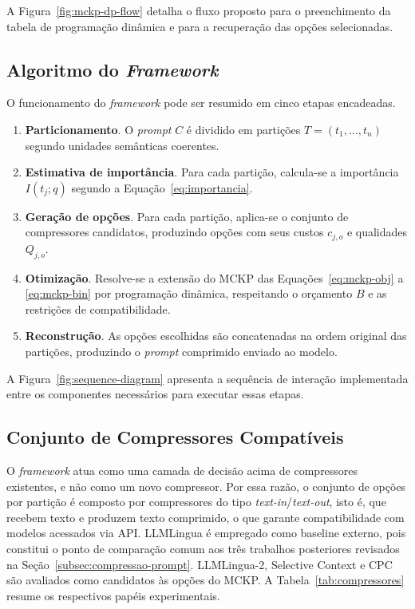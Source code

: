 A Figura~\ref{fig:mckp-dp-flow} detalha o fluxo proposto para o preenchimento da tabela de programação dinâmica e para a recuperação das opções selecionadas.



\subsection{Algoritmo do \textit{Framework}}
\label{subsec:algoritmo}

O funcionamento do \textit{framework} pode ser resumido em cinco etapas encadeadas.

\begin{enumerate}[leftmargin=1.8em]
\item \textbf{Particionamento}. O \textit{prompt} $C$ é dividido em partições $T = (t_1, \ldots, t_n)$ segundo unidades semânticas coerentes.

\item \textbf{Estimativa de importância}. Para cada partição, calcula-se a importância $I(t_j; q)$ segundo a Equação~\ref{eq:importancia}.

\item \textbf{Geração de opções}. Para cada partição, aplica-se o conjunto de compressores candidatos, produzindo opções com seus custos $c_{j,o}$ e qualidades $Q_{j,o}$.

\item \textbf{Otimização}. Resolve-se a extensão do MCKP das Equações~\ref{eq:mckp-obj} a \ref{eq:mckp-bin} por programação dinâmica, respeitando o orçamento $B$ e as restrições de compatibilidade.

\item \textbf{Reconstrução}. As opções escolhidas são concatenadas na ordem original das partições, produzindo o \textit{prompt} comprimido enviado ao modelo.
\end{enumerate}

A Figura~\ref{fig:sequence-diagram} apresenta a sequência de interação implementada entre os componentes necessários para executar essas etapas.



\subsection{Conjunto de Compressores Compatíveis}
\label{subsec:pool}

O \textit{framework} atua como uma camada de decisão acima de compressores existentes, e não como um novo compressor. Por essa razão, o conjunto de opções por partição é composto por compressores do tipo \textit{text-in}/\textit{text-out}, isto é, que recebem texto e produzem texto comprimido, o que garante compatibilidade com modelos acessados via API. LLMLingua é empregado como baseline externo, pois constitui o ponto de comparação comum aos três trabalhos posteriores revisados na Seção~\ref{subsec:compressao-prompt}. LLMLingua-2, Selective Context e CPC são avaliados como candidatos às opções do MCKP. A Tabela~\ref{tab:compressores} resume os respectivos papéis experimentais.

